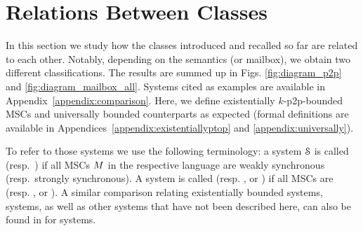 \documentclass[a4paper,UKenglish,cleveref, autoref, thm-restate]{lipics-v2021}
\begin{document}



\section{Relations Between Classes}\label{section:comparison}



In this section we study how the classes introduced and recalled so far are related to each other. Notably, depending on the semantics (\pp or mailbox), we obtain two different classifications. The results are summed up in Figs. \ref{fig:diagram_p2p} and \ref{fig:diagram_mailbox_all}.
Systems cited as examples are available in Appendix~\ref{appendix:comparison}.
Here, we define existentially $k$-p2p-bounded MSCs and universally bounded counterparts as expected (formal definitions are available in Appendices~\ref{appendix:existentiallyptop} and \ref{appendix:universally}).


To refer to those systems we use the following terminology:
a system $\mathcal{S}$ is called
\wS{} (resp.\ \sS{}) if all MSCs $M$ in the respective language
are weakly synchronous (resp.\ strongly synchronous).
A system is called  (resp. , \eb{} or \ub{})
if all MSCs are  (resp. ,  or ).
A similar comparison relating existentially bounded systems,  systems, as well as other systems that have not been described here, can also be found in \cite{DBLP:journals/corr/abs-1901-09606} for \pp systems.

\end{document}
